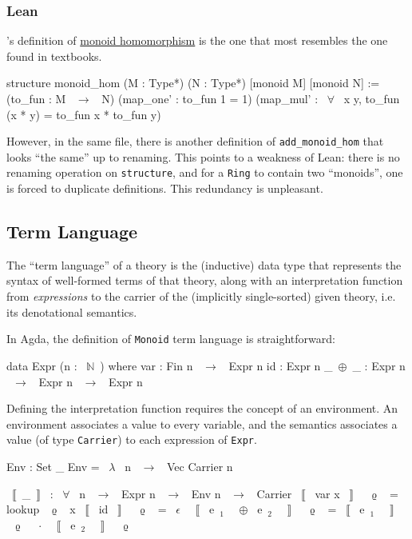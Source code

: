 \subsubsection{Lean}\hspace{-0.4em}'s
definition of \href{https://github.com/leanprover-community/mathlib/blob/3c58f160fd51ebf989138ed7c8981f821f08f860/src/algebra/group/hom.lean}
{monoid homomorphism}
is the one that most resembles the one found in textbooks. 
\begin{leancode}
structure monoid_hom (M : Type*) (N : Type*) 
[monoid M] [monoid N] :=
(to_fun : M ~$\to$~ N)
(map_one' : to_fun 1 = 1)
(map_mul' : ~$\forall$~ x y, to_fun (x * y) = to_fun x * to_fun y)
\end{leancode}

However, in the same file, there is another definition of \verb|add_monoid_hom| that looks ``the same'' up to renaming. This points
to a weakness of Lean: there is no renaming operation on 
\verb|structure|, and for a \verb|Ring| to contain two ``monoids'', one
is forced to duplicate definitions. This redundancy is unpleasant.

\subsection{Term Language}

The ``term language'' of a theory is the (inductive) data type
that represents the syntax of well-formed terms of that theory,
along with an interpretation function from \emph{expressions} 
to the carrier of the (implicitly single-sorted) given theory, i.e.
its denotational semantics.

In Agda, the definition of \lstinline|Monoid| term language is straightforward:
\begin{agdacode}
data Expr (n : ~$\mathbb{N}$~) where 
var : Fin n ~$\to$~ Expr n 
id : Expr n 
_~$\oplus$~_ : Expr n ~$\to$~ Expr n ~$\to$~ Expr n 
\end{agdacode}
Defining the interpretation function requires the concept of an environment.
An environment associates a value to every variable, and the semantics
associates a value (of type \verb|Carrier|) to each expression of \verb|Expr|.
\begin{agdacode}
Env : Set _ 
Env = ~$\lambda$~ n ~$\rightarrow$~ Vec Carrier n 

~$\llbracket$~_~$\rrbracket$~ : ~$\forall$~ {n} ~$\to$~ Expr n ~$\to$~ Env n ~$\to$~ Carrier 
~$\llbracket$~ var x ~$\rrbracket$~ ~$\upvarrho$~ = lookup ~$\upvarrho$~ x 
~$\llbracket$~ id ~$\rrbracket$~ ~$\upvarrho$~ = ~$\epsilon$~ 
~$\llbracket$~ e~$_1$~ ~$\oplus$~ e~$_2$~ ~$\rrbracket$~ ~$\upvarrho$~ = ~$\llbracket$~ e~$_1$~ ~$\rrbracket$~ ~$\upvarrho$~ ~$\cdot$~ ~$\llbracket$~ e~$_2$~ ~$\rrbracket$~ ~$\upvarrho$~ 
\end{agdacode}


